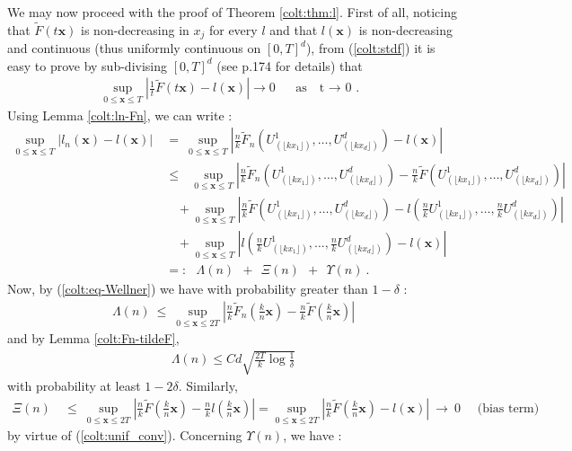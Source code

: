  We may now proceed with the proof of Theorem \ref{colt:thm:l}.
First of all, noticing that $\tilde F(t\mathbf{x})$ is non-decreasing in $x_j$ for every $l$ and that $l(\mathbf{x})$ is non-decreasing and continuous (thus uniformly continuous on $[0,T]^d$), from (\ref{colt:stdf}) it is easy to prove by sub-divising $[0,T]^d$ (see \cite{Qi97} p.174 for details) that 
\begin{align}
\label{colt:unif_conv}
\sup_{0 \le \mathbf{x} \le T}\left| \frac{1}{t} \tilde F ( t \mathbf{x})-l(\mathbf{x}) \right|  \to 0 \text{~~~ as~~ t $\to$ 0 . }
\end{align}
\noindent
Using Lemma \ref{colt:ln-Fn}, we can write :
\begin{align*}
\sup_{0 \le \mathbf{x} \le T} \left| l_n(\mathbf{x}) - l(\mathbf{x}) \right| &~=~ \sup_{0 \le \mathbf{x} \le T} \left| \frac{n}{k} \tilde F_n \left( U_{(\lfloor kx_1\rfloor )}^1,\ldots, U_{(\lfloor kx_d\rfloor )}^d \right) - l(\mathbf{x}) \right| \\
& ~\le~~~ \sup_{0 \le \mathbf{x} \le T} \left| \frac{n}{k} \tilde F_n \left(U_{(\lfloor kx_1\rfloor )}^1,\ldots, U_{(\lfloor kx_d\rfloor )}^d \right) - \frac{n}{k} \tilde F \left(U_{(\lfloor kx_1\rfloor )}^1,\ldots, U_{(\lfloor kx_d\rfloor )}^d \right)  \right| 
\\&~~~~~ + \sup_{0 \le \mathbf{x} \le T} \left| \frac{n}{k} \tilde F \left(U_{(\lfloor kx_1\rfloor )}^1,\ldots, U_{(\lfloor kx_d\rfloor )}^d \right) - l \left(\frac{n}{k} U_{(\lfloor kx_1\rfloor )}^1,\ldots, \frac{n}{k} U_{(\lfloor kx_d\rfloor )}^d \right) \right|
\\&~~~~~ + \sup_{0 \le \mathbf{x} \le T} \left| l \left(\frac{n}{k} U_{(\lfloor kx_1\rfloor )}^1, \ldots,\frac{n}{k} U_{(\lfloor kx_d\rfloor )}^d \right) - l(\mathbf{x}) \right|
\\&~=:~~~ \Lambda(n) ~~+~~ \Xi(n) ~~+~~ \Upsilon(n)~.
\end{align*}
\noindent
Now, by (\ref{colt:eq-Wellner}) we have with probability greater than $1-\delta$ :
\begin{align*} 
\Lambda(n) ~\le~ \sup_{0 \le \mathbf{x} \le 2T}\left|\frac{n}{k} \tilde F_n(\frac{k}{n}\mathbf{x})-\frac{n}{k} \tilde F ( \frac{k}{n} \mathbf{x})\right|
\end{align*}
\noindent
and by Lemma \ref{colt:Fn-tildeF}, 
\begin{align*}
 \Lambda(n) \le Cd \sqrt{\frac{2 T}{k}\log\frac{1}{\delta}}   
\end{align*}
\noindent
with probability at least $1-2\delta$. Similarly,
\begin{align*} 
\Xi(n) &~\le~  \sup_{0 \le \mathbf{x} \le  2 T}\left|\frac{n}{k}
  \tilde F(\frac{k}{n}\mathbf{x})-\frac{n}{k} l ( \frac{k}{n}
  \mathbf{x})\right| = 
 \sup_{0 \le \mathbf{x} \le  2 T} \left|\frac{n}{k}
  \tilde F(\frac{k}{n}\mathbf{x})- l (
  \mathbf{x})\right| ~\to~0 \quad\text{ (bias term)} 
\end{align*}
by virtue of (\ref{colt:unif_conv}). Concerning $\Upsilon(n)$, we have :

